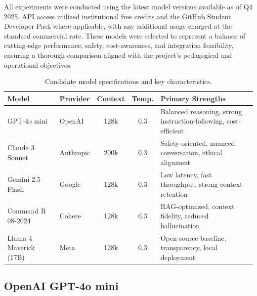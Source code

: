 All experiments were conducted using the latest model versions available as of Q4 2025. API access utilized institutional free credits and the GitHub Student Developer Pack where applicable, with any additional usage charged at the standard commercial rate. These models were selected to represent a balance of cutting-edge performance, safety, cost-awareness, and integration feasibility, ensuring a thorough comparison aligned with the project's pedagogical and operational objectives.

\begin{table}[t]
\centering
\caption{Candidate model specifications and key characteristics.}
\label{tab:candidate_models}
\begin{tabularx}{\textwidth}{@{}l l c c X@{}}
\toprule
\textbf{Model} & \textbf{Provider} & \textbf{Context} & \textbf{Temp.} & \textbf{Primary Strengths} \\ \midrule
GPT-4o mini & OpenAI & 128k & 0.3 & Balanced reasoning, strong instruction-following, cost-efficient \\
Claude 3 Sonnet & Anthropic & 200k & 0.3 & Safety-oriented, nuanced conversation, ethical alignment \\
Gemini 2.5 Flash & Google & 128k & 0.3 & Low latency, fast throughput, strong context retention \\
Command R 08-2024 & Cohere & 128k & 0.3 & RAG-optimized, context fidelity, reduced hallucination \\
Llama 4 Maverick (17B) & Meta & 128k & 0.3 & Open-source baseline, transparency, local deployment \\ \bottomrule
\end{tabularx}
\end{table}

\FloatBarrier

\subsection{OpenAI GPT-4o mini}
\label{sec:model_gpt4o_mini}

